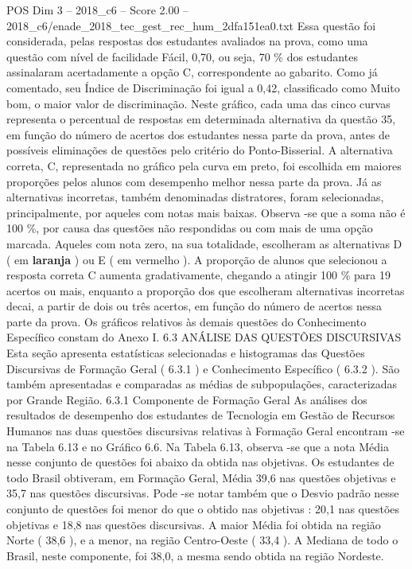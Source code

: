 \begin{textsample}{POS Dim 3 – 2018\_c6 – Score 2.00 – 2018\_c6/enade\_2018\_tec\_gest\_rec\_hum\_2dfa151ea0.txt}
Essa questão foi considerada, pelas respostas dos estudantes avaliados na prova, como uma questão com nível de facilidade Fácil, 0,70, ou seja, 70 \% dos estudantes assinalaram acertadamente a opção C, correspondente ao gabarito.
Como já comentado, seu Índice de Discriminação foi igual a 0,42, classificado como Muito bom, o maior valor de discriminação.
Neste gráfico, cada uma das cinco curvas representa o percentual de respostas em determinada alternativa da questão 35, em função do número de acertos dos estudantes nessa parte da prova, antes de possíveis eliminações de questões pelo critério do Ponto-Bisserial.
A alternativa correta, C, representada no gráfico pela curva em preto, foi escolhida em maiores proporções pelos alunos com desempenho melhor nessa parte da prova.
Já as alternativas incorretas, também denominadas distratores, foram selecionadas, principalmente, por aqueles com notas mais baixas.
Observa -se que a soma não é 100 \%, por causa das questões não respondidas ou com mais de uma opção marcada.
Aqueles com nota zero, na sua totalidade, escolheram as alternativas D ( em \textbf{laranja} ) ou E ( em vermelho ).
A proporção de alunos que selecionou a resposta correta C aumenta gradativamente, chegando a atingir 100 \% para 19 acertos ou mais, enquanto a proporção dos que escolheram alternativas incorretas decai, a partir de dois ou três acertos, em função do número de acertos nessa parte da prova.
Os gráficos relativos às demais questões do Conhecimento Específico constam do Anexo I. 6.3 ANÁLISE DAS QUESTÕES DISCURSIVAS Esta seção apresenta estatísticas selecionadas e histogramas das Questões Discursivas de Formação Geral ( 6.3.1 ) e Conhecimento Específico ( 6.3.2 ).
São também apresentadas e comparadas as médias de subpopulações, caracterizadas por Grande Região. 6.3.1 Componente de Formação Geral As análises dos resultados de desempenho dos estudantes de Tecnologia em Gestão de Recursos Humanos nas duas questões discursivas relativas à Formação Geral encontram -se na Tabela 6.13 e no Gráfico 6.6.
Na Tabela 6.13, observa -se que a nota Média nesse conjunto de questões foi abaixo da obtida nas objetivas.
Os estudantes de todo Brasil obtiveram, em Formação Geral, Média 39,6 nas questões objetivas e 35,7 nas questões discursivas.
Pode -se notar também que o Desvio padrão nesse conjunto de questões foi menor do que o obtido nas objetivas : 20,1 nas questões objetivas e 18,8 nas questões discursivas.
A maior Média foi obtida na região Norte ( 38,6 ), e a menor, na região Centro-Oeste ( 33,4 ).
A Mediana de todo o Brasil, neste componente, foi 38,0, a mesma sendo obtida na região Nordeste.

\end{textsample}
